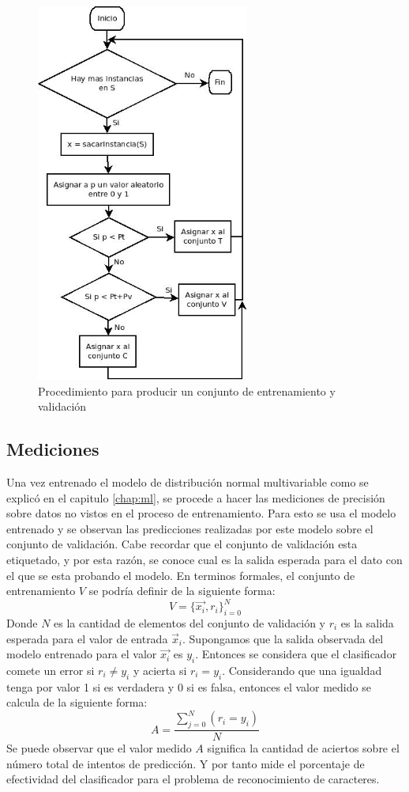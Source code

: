 \documentclass[a4paper, 11pt, oneside]{report}
\begin{document}
\begin{figure}[htb]
\begin{center}
\leavevmode
\includegraphics[width=7cm]{diagrams/setPartition.jpg}
\end{center}
\caption{Procedimiento para producir un conjunto de entrenamiento y validación}
\label{fig:setPartition}
\end{figure}

\subsection{Mediciones}

Una vez entrenado el modelo de distribución normal multivariable como se explicó en el capitulo \ref{chap:ml}, se procede a hacer las mediciones de precisión sobre datos no vistos en el proceso de entrenamiento. Para esto se usa el modelo entrenado y se observan las predicciones realizadas por este modelo sobre el conjunto de validación. Cabe recordar que el conjunto de validación esta etiquetado, y por esta razón, se conoce cual es la salida esperada para el dato con el que se esta probando el modelo. En terminos formales, el conjunto de entrenamiento $V$ se podría definir de la siguiente forma:
\[ V = \{\vec{x_i},r_i\}_{i=0}^N \]
Donde $N$ es la cantidad de elementos del conjunto de validación y $r_i$ es la salida esperada para el valor de entrada $\vec{x}_i$. Supongamos que la salida observada del modelo entrenado para el valor $\vec{x_i}$ es $y_i$. Entonces se considera que el clasificador comete un error si $r_i \ne y_i$ y acierta si $r_i = y_i$. Considerando que una igualdad tenga por valor 1 si es verdadera y 0 si es falsa, entonces el valor medido se calcula de la siguiente forma:
\[ A = \frac{ \sum_{j=0}^{N}(r_i=y_i) }{N} \]
Se puede observar que el valor medido $A$ significa la cantidad de aciertos sobre el número total de intentos de predicción. Y por tanto mide el porcentaje de efectividad del clasificador para el problema de reconocimiento de caracteres.
\end{document}
